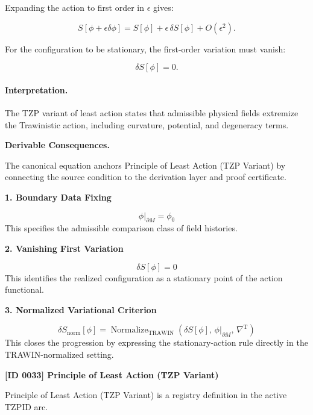 Expanding the action to first order in $\epsilon$ gives:

\begin{equation}
S[\phi+\epsilon\delta\phi]
=
S[\phi]
+
\epsilon\,\delta S[\phi]
+
O(\epsilon^2).
\end{equation}

For the configuration to be stationary, the first-order variation must vanish:

\begin{equation}
\boxed{
\delta S[\phi]=0 .
}
\end{equation}

\paragraph{Interpretation.}
The TZP variant of least action states that admissible physical fields extremize the Trawinistic action, including curvature, potential, and degeneracy terms.

\par\vspace{0.35em}
\noindent\textbf{Derivable Consequences.}\quad
\begingroup
\footnotesize
\raggedright
The canonical equation anchors Principle of Least Action (TZP Variant) by connecting the source condition to the derivation layer and proof certificate.
\par\endgroup

\noindent\textbf{1. Boundary Data Fixing}\par
\[
\phi\big\vert_{\partial M}
=
\phi_{0}
\]
\noindent This specifies the admissible comparison class of field histories.\par
\noindent\textbf{2. Vanishing First Variation}\par
\[
\delta S[\phi] = 0
\]
\noindent This identifies the realized configuration as a stationary point of the action functional.\par
\noindent\textbf{3. Normalized Variational Criterion}\par
\[
\delta S_{\mathrm{norm}}[\phi]
=
\operatorname{Normalize}_{\mathrm{TRAWIN}}
\!\left(
\delta S[\phi],\,
\phi\vert_{\partial M},\,
\nabla^{\mathrm{T}}
\right)
\]
\noindent This closes the progression by expressing the stationary-action rule directly in the TRAWIN-normalized setting.\par

\clearpage
\noindent\textbf{[ID 0033] Principle of Least Action (TZP Variant)}\par
\vspace{0.35em}
\begingroup\small
{}
Principle of Least Action (TZP Variant) is a registry definition in the active TZPID arc.

